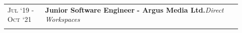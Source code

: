\documentclass[a4paper,10pt]{extarticle} %
\begin{document}
{\begin{tabular}{>{\raggedright\arraybackslash}p{0.15\linewidth} | >{\raggedright\arraybackslash}p{0.78\linewidth}}
\textsc{Jul ‘19 - Oct ‘21} & \textbf{Junior Software Engineer} \textbf{ - Argus Media Ltd.}\hfill\textit{Direct Workspaces}\\
\multicolumn{2}{c}{} \\


\end{tabular}}
\end{document}
